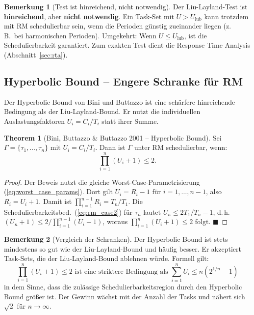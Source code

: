 ﻿\documentclass[a4paper,12pt]{report}
\theoremstyle{definition}
\newtheorem{bemerkung}{Bemerkung}[chapter]
\newtheorem{theorem}{Theorem}[chapter]
\begin{document}
\begin{bemerkung}[Test ist hinreichend, nicht notwendig]
	Der Liu-Layland-Test ist \textbf{hinreichend}, aber \textbf{nicht notwendig}.
	Ein Task-Set mit $U > U_{\text{lub}}$ kann trotzdem mit RM schedulierbar sein,
	wenn die Perioden günstig zueinander liegen (z.\,B.\ bei harmonischen Perioden).
	Umgekehrt: Wenn $U \leq U_{\text{lub}}$, ist die Schedulierbarkeit garantiert.
	Zum exakten Test dient die Response Time Analysis (Abschnitt~\ref{sec:rta}).
\end{bemerkung}

\subsection{Hyperbolic Bound -- Engere Schranke für RM}

Der Hyperbolic Bound von Bini und Buttazzo \cite{Bini2001} ist eine schärfere
hinreichende Bedingung als der Liu-Layland-Bound. Er nutzt die individuellen
Auslastungsfaktoren $U_i = C_i/T_i$ statt ihrer Summe.

\begin{theorem}[Bini, Buttazzo \& Buttazzo 2001 -- Hyperbolic Bound]
	\label{thm:hyperbolic}
	Sei $\Gamma = \{\tau_1, \ldots, \tau_n\}$ mit $U_i = C_i/T_i$. Dann ist
	$\Gamma$ unter RM schedulierbar, wenn:
	\[
		\prod_{i=1}^{n} (U_i + 1) \leq 2.
	\]
\end{theorem}

\begin{proof}
	Der Beweis nutzt die gleiche Worst-Case-Parametrisierung (\ref{eq:worst_case_params}).
	Dort gilt $U_i = R_i - 1$ für $i = 1,\ldots,n-1$, also $R_i = U_i + 1$. Damit ist
	$\prod_{i=1}^{n-1} R_i = T_n/T_1$. Die Schedulierbarkeitsbed.~(\ref{eq:rm_case2})
	für $\tau_n$ lautet $U_n \leq 2T_1/T_n - 1$, d.\,h.\ $(U_n+1) \leq 2 / \prod_{i=1}^{n-1}(U_i+1)$,
	woraus $\prod_{i=1}^{n}(U_i+1) \leq 2$ folgt. \hfill$\blacksquare$
\end{proof}

\begin{bemerkung}[Vergleich der Schranken]
	Der Hyperbolic Bound ist stets mindestens so gut wie der Liu-Layland-Bound und
	häufig besser. Er akzeptiert Task-Sets, die der Liu-Layland-Bound ablehnen würde.
	Formell gilt:
	\[
		\prod_{i=1}^{n}(U_i + 1) \leq 2 \text{ ist eine striktere Bedingung als } \sum_{i=1}^n U_i \leq n(2^{1/n}-1)
	\]
	in dem Sinne, dass die zulässige Schedulierbarkeitsregion durch den Hyperbolic
	Bound größer ist. Der Gewinn wächst mit der Anzahl der Tasks und nähert sich
	$\sqrt{2}$ für $n \to \infty$.
\end{bemerkung}
\end{document}
